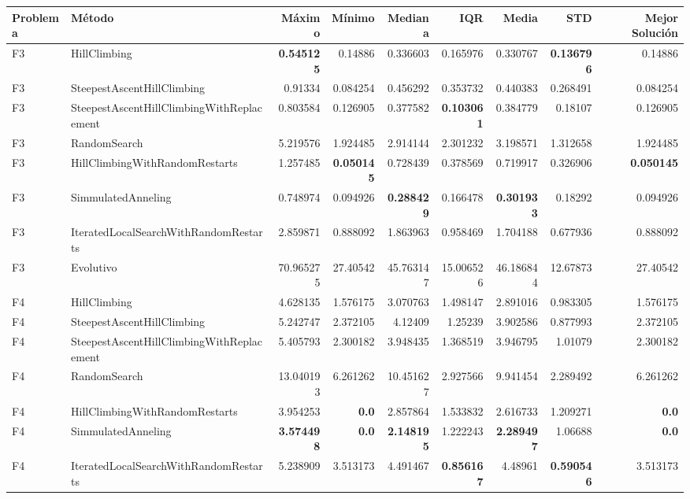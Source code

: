 \begin{tabular}{llrrrrrrr}
\toprule
Problema & Método & Máximo & Mínimo & Mediana & IQR & Media & STD & Mejor Solución \\ 
\midrule
F3 & HillClimbing & \textbf{0.545125} & 0.14886 & 0.336603 & 0.165976 & 0.330767 & \textbf{0.136796} & 0.14886 \\ 
F3 & SteepestAscentHillClimbing & 0.91334 & 0.084254 & 0.456292 & 0.353732 & 0.440383 & 0.268491 & 0.084254 \\ 
F3 & SteepestAscentHillClimbingWithReplacement & 0.803584 & 0.126905 & 0.377582 & \textbf{0.103061} & 0.384779 & 0.18107 & 0.126905 \\ 
F3 & RandomSearch & 5.219576 & 1.924485 & 2.914144 & 2.301232 & 3.198571 & 1.312658 & 1.924485 \\ 
F3 & HillClimbingWithRandomRestarts & 1.257485 & \textbf{0.050145} & 0.728439 & 0.378569 & 0.719917 & 0.326906 & \textbf{0.050145} \\ 
F3 & SimmulatedAnneling & 0.748974 & 0.094926 & \textbf{0.288429} & 0.166478 & \textbf{0.301933} & 0.18292 & 0.094926 \\ 
F3 & IteratedLocalSearchWithRandomRestarts & 2.859871 & 0.888092 & 1.863963 & 0.958469 & 1.704188 & 0.677936 & 0.888092 \\ 
F3 & Evolutivo & 70.965275 & 27.40542 & 45.763147 & 15.006526 & 46.186844 & 12.67873 & 27.40542 \\ 
\midrule
F4 & HillClimbing & 4.628135 & 1.576175 & 3.070763 & 1.498147 & 2.891016 & 0.983305 & 1.576175 \\ 
F4 & SteepestAscentHillClimbing & 5.242747 & 2.372105 & 4.12409 & 1.25239 & 3.902586 & 0.877993 & 2.372105 \\ 
F4 & SteepestAscentHillClimbingWithReplacement & 5.405793 & 2.300182 & 3.948435 & 1.368519 & 3.946795 & 1.01079 & 2.300182 \\ 
F4 & RandomSearch & 13.040193 & 6.261262 & 10.451627 & 2.927566 & 9.941454 & 2.289492 & 6.261262 \\ 
F4 & HillClimbingWithRandomRestarts & 3.954253 & \textbf{0.0} & 2.857864 & 1.533832 & 2.616733 & 1.209271 & \textbf{0.0} \\ 
F4 & SimmulatedAnneling & \textbf{3.574498} & \textbf{0.0} & \textbf{2.148195} & 1.222243 & \textbf{2.289497} & 1.06688 & \textbf{0.0} \\ 
F4 & IteratedLocalSearchWithRandomRestarts & 5.238909 & 3.513173 & 4.491467 & \textbf{0.856167} & 4.48961 & \textbf{0.590546} & 3.513173 \\ 

\end{tabular}
